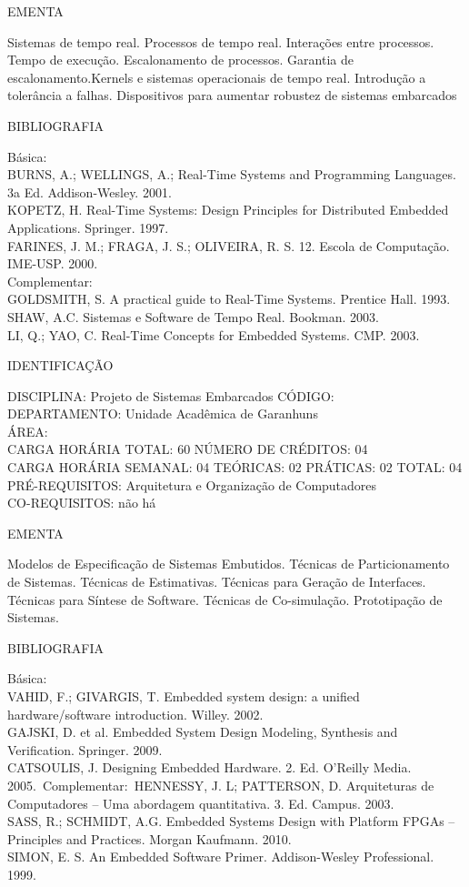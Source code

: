 \documentclass[
	12pt,				%
	openright,			%
  oneside,     %
	a4paper,			%
	chapter=TITLE,		%
	english,			%
	french,				%
	spanish,			%
	brazil				%
	]{abntex2}
\begin{document}
\begin{apendicesenv}
EMENTA 

Sistemas de tempo real. Processos de tempo real. Interações entre
processos. Tempo de execução. Escalonamento de processos. Garantia de
escalonamento.Kernels e sistemas operacionais de tempo real. Introdução a tolerância a
falhas. Dispositivos para aumentar robustez de sistemas embarcados

BIBLIOGRAFIA 

Básica:\\
BURNS, A.; WELLINGS, A.; Real-Time Systems and Programming Languages. 3a
Ed. Addison-Wesley. 2001.\\
KOPETZ, H. Real-Time Systems: Design Principles for Distributed Embedded
Applications. Springer. 1997.\\
FARINES, J. M.; FRAGA, J. S.; OLIVEIRA, R. S. 12. Escola de Computação.
IME-USP. 2000.\\
Complementar:\\
GOLDSMITH, S. A practical guide to Real-Time Systems. Prentice Hall.
1993.\\
SHAW, A.C. Sistemas e Software de Tempo Real. Bookman. 2003.\\
LI, Q.; YAO, C. Real-Time Concepts for Embedded Systems. CMP. 2003.

\newpage IDENTIFICAÇÃO

DISCIPLINA: Projeto de Sistemas Embarcados CÓDIGO:\\ 
DEPARTAMENTO: Unidade Acadêmica de Garanhuns\\
ÁREA: \\
CARGA HORÁRIA TOTAL: 60 NÚMERO DE CRÉDITOS: 04\\
CARGA HORÁRIA SEMANAL: 04 TEÓRICAS: 02 PRÁTICAS: 02 TOTAL: 04\\
PRÉ-REQUISITOS: Arquitetura e Organização de Computadores\\
CO-REQUISITOS: não há

EMENTA 

Modelos de Especificação de Sistemas Embutidos. Técnicas de
Particionamento de Sistemas. Técnicas de Estimativas. Técnicas para
Geração de Interfaces. Técnicas para Síntese de Software. Técnicas de
Co-simulação. Prototipação de Sistemas.

BIBLIOGRAFIA 

Básica:\\
VAHID, F.; GIVARGIS, T. Embedded system design: a unified
hardware/software introduction. Willey. 2002.\\
GAJSKI, D. et al. Embedded System Design  Modeling, Synthesis and
Verification. Springer. 2009.\\
CATSOULIS, J. Designing Embedded Hardware. 2. Ed.
O'Reilly Media. 2005.\
Complementar:\
HENNESSY, J. L; PATTERSON, D. Arquiteturas de Computadores -- Uma
abordagem quantitativa. 3. Ed. Campus. 2003.\\
SASS, R.; SCHMIDT, A.G. Embedded Systems Design with Platform FPGAs --
Principles and Practices. Morgan Kaufmann. 2010.\\
SIMON, E. S. An Embedded Software Primer. Addison-Wesley Professional.
1999.


\end{apendicesenv}
\end{document}
